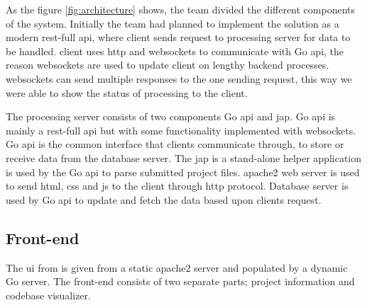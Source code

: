 As the figure \ref{fig:architecture} shows, the team divided the different components of the system. Initially the team had planned to implement the solution as a modern \gls{rest}-full \gls{api}, where \gls{client} sends request to processing server for data to be handled. \Gls{client} uses \gls{http} and \glspl{websocket} to communicate with Go \gls{api}, the reason \glspl{websocket} are used to update \gls{client} on lengthy \gls{backend} processes. \glspl{websocket} can send multiple responses to the one sending request, this way we were able to show the status of processing to the \gls{client}.

The processing server consists of two components Go \gls{api} and \gls{jap}. Go \gls{api} is mainly a \gls{rest}-full \gls{api} but with some functionality implemented with \glspl{websocket}. Go \gls{api} is the common interface that \glspl{client} communicate through, to store or receive data from the database server. The \gls{jap} is a stand-alone helper application is used by the Go \gls{api} to parse submitted project files. \Gls{apache2} web server is used to send \gls{html}, \gls{css} and \gls{js} to the \gls{client} through \gls{http} protocol. Database server is used by Go \gls{api} to update and fetch the data based upon \glspl{client} request.

\subsection{Front-end}



The \gls{ui} from is given from a static \Gls{apache2} server and populated by a dynamic \Gls{Go} server. The front-end consists of two separate parts; project information and codebase visualizer.

